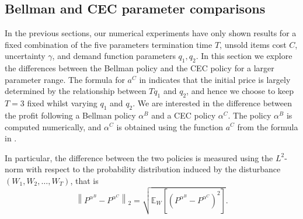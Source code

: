 \documentclass[main.tex]{subfiles}
\begin{document}

\subsection{Bellman and CEC parameter comparisons}\label{sec:parameter_comparison}
In the previous sections, our numerical experiments have only shown
results for a fixed combination of the five parameters
termination time $T$, unsold items cost $C$, uncertainty $\gamma$, and
demand function parameters $q_1,q_2$.
In this section we explore the differences between the Bellman policy
and the CEC policy for a larger parameter range.
The formula for $a^C$ in  indicates that the
initial price is largely determined by the relationship between
$Tq_1$ and $q_2$, and hence we choose to keep $T=3$ fixed whilst
varying $q_1$ and $q_2$.
We are interested in the difference between the profit following
a Bellman policy $\alpha^B$ and a CEC policy $\alpha^C$.
The policy $\alpha^B$ is computed numerically, and
$\alpha^C$ is obtained using the function $a^C$ from
the formula in .

In particular, the difference between the two policies is measured
using the $L^2$-norm with respect to the probability distribution
induced by the disturbance $(W_1,W_2,\dots,W_T)$, that is
\begin{equation}
  \left\|P^{\alpha^B}-P^{\alpha^C}\right\|_2
  =\sqrt{\mathbb E_W\left[{( P^{\alpha^B}-P^{\alpha^C} )}^2 \right]}.
\end{equation}
\end{document}
